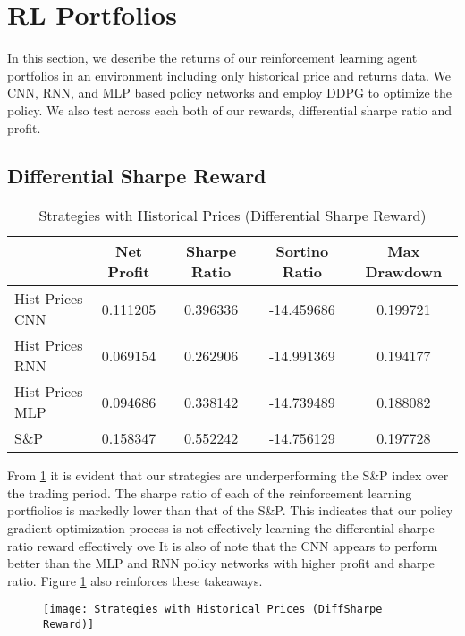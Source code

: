 \section{RL Portfolios}
In this section, we describe the returns of our reinforcement learning agent portfolios in an environment including only historical price and returns data. We CNN, RNN, and MLP based policy networks and employ DDPG to optimize the policy.
We also test across each both of our rewards, differential sharpe ratio and profit.

\subsection{Differential Sharpe Reward}
\begin{table}[htbp]
    \centering
    \caption{Strategies with Historical Prices (Differential Sharpe Reward)}
      \begin{tabular}{lcccc}
      \toprule
            & Net Profit & Sharpe Ratio & Sortino Ratio & Max Drawdown \\
      \midrule
      Hist Prices CNN & 0.111205 & 0.396336 & -14.459686 & 0.199721 \\
      Hist Prices RNN & 0.069154 & 0.262906 & -14.991369 & 0.194177 \\
      Hist Prices MLP & 0.094686 & 0.338142 & -14.739489 & 0.188082 \\
      S\&P   & 0.158347 & 0.552242 & -14.756129 & 0.197728 \\
      \bottomrule
      \end{tabular}%
    \label{tab:rl_strategies_diff_table}%
  \end{table}%

  From \ref{tab:rl_strategies_diff_table} it is evident that our strategies are underperforming the S\&P index over the trading period.
  The sharpe ratio of each of the reinforcement learning portfiolios is markedly lower than that of the S\&P.
  This indicates that our policy gradient optimization process is not effectively learning the differential sharpe ratio reward effectively ove 
  It is also of note that the CNN appears to perform better than the MLP and RNN policy networks with higher profit and sharpe ratio. Figure \ref{fig:rl_strategies_diff_figure} also reinforces these takeaways.

  \begin{center}
    \begin{figure}
    \texttt{[image: Strategies with Historical Prices (DiffSharpe Reward)]}
    \label{fig:rl_strategies_diff_figure}
    \end{figure}
    \end{center}


